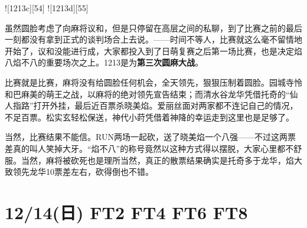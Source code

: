 ![1213c][54]
![1213d][55]

虽然圆脸考虑了向麻将议和，但是只停留在高层之间的私聊，到了比赛之前的最后一刻都没有拿到正式的谈判场合上去说。——时间不等人，比赛就这么毫不留情地开始了，议和没能进行成，大家都投入到了日萌复赛之后第一场比赛，也是决定焰八焰不八的重要场次之上。1213是为\textbf{第三次圆麻大战}。

比赛就是比赛，麻将没有给圆脸任何机会，全天领先，狠狠压制着圆脸。园城寺怜和巴麻美的萌王之战，以麻将的绝对领先宣告结束；而清水谷龙华凭借托奇的“仙人指路”打开外挂，最后近百票杀晓美焰。爱丽丝面对两家都不连记自己的情况，不足百票。松实玄轻松保送，神代小莳凭借着神降的幸运走到这里也是足够了。

当然，比赛结果不能信。RUN两场一起砍，送了晓美焰一个八强——不过这两票差真的叫人笑掉大牙。“焰不八”的称号竟然以这种方式得以摆脱，大家心里都不舒服。当然，麻将被砍死也是理所当然，真正的散票结果确实是托奇多于龙华，焰大致领先龙华10票差左右，砍得倒也不错。

\section{12/14(日) FT2 FT4 FT6 FT8}


